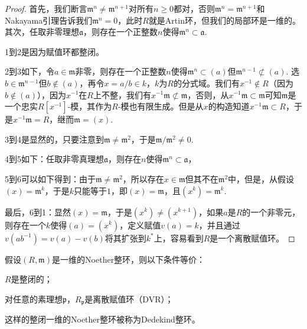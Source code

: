 \begin{proof}
	首先，我们断言$\mathfrak m^n\neq \mathfrak m^{n+1}$对所有$n\geq 0$都对，否则$\mathfrak m^n=\mathfrak m^{n+1}$和Nakayama引理告诉我们$\mathfrak m^n=0$，此时$R$就是Artin环，但我们的局部环是一维的。其次，任取非零理想$\mathfrak a$，则存在一个正整数$n$使得$\mathfrak m^n\subset \mathfrak a$. \notprove

	1到2是因为赋值环都整闭。
	
	2到3如下，令$a\in \mathfrak m$非零，则存在一个正整数$n$使得$\mathfrak{m}^n\subset (a)$但$\mathfrak m^{n-1}\not\subset (a)$. 选$b\in \mathfrak m^{n-1}$但$b\not\in (a)$，再令$x=a/b\in k$，$k$为$R$的分式域。我们有$x^{-1}\not\in R$（因为$b\not\in (a)$），因为$x^{-1}$在$R$上不整，我们有$x^{-1}\mathfrak m\not\subset \mathfrak m$，否则，从$x^{-1}\mathfrak m\subset \mathfrak m$可知$\mathfrak m$是一个忠实$R[x^{-1}]$-模，其作为$R$-模也有限生成。但是从$x$的构造知道$x^{-1}\mathfrak m\subset R$，于是$x^{-1}\mathfrak m=R$，继而$\mathfrak m=(x)$.

	3到4是显然的，只要注意到$\mathfrak m\neq \mathfrak m^2$，于是$\mathfrak m/\mathfrak m^2\neq 0$. 
	
	4到5如下：任取非零真理想$\mathfrak a$，则存在$n$使得$\mathfrak m^n\subset \mathfrak a$，\notprove

	5到6可以如下得到：由于$\mathfrak m\neq \mathfrak m^2$，所以存在$x\in \mathfrak m$但其不在$\mathfrak m^2$中，但是，从假设$(x)=\mathfrak m^k$，于是$k$只能等于$1$，即$(x)=\mathfrak m$，且$(x^k)=\mathfrak m^k$.

	最后，6到1：显然$(x)=\mathfrak m$，于是$(x^k)\neq (x^{k+1})$，如果$a$是$R$的一个非零元，则存在一个$k$使得$(a)=(x^k)$，定义赋值$v(a)=k$，并且通过$v(ab^{-1})=v(a)-v(b)$将其扩张到$k^*$上，容易看到$R$是一个离散赋值环。
\end{proof}

\begin{theo}
	假设$(R,\mathfrak m)$是一维的Noether整环，则以下条件等价：
	\begin{compactenum}
		\item $R$是整闭的；
		\item 对任意的素理想$\mathfrak p$，$R_{\mathfrak p}$是离散赋值环（DVR）；
	\end{compactenum}
\end{theo}

这样的整闭一维的Noether整环被称为Dedekind整环。